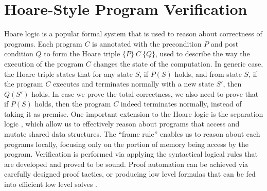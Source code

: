 \label{chapt:related}

\section{Hoare-Style Program Verification}

Hoare logic \cite{hoare69} is a popular formal system that is used to reason about correctness of programs.
Each program $C$ is annotated with the precondition $P$ and post condition $Q$ to form the Hoare triple $\{P\}~C~\{Q\}$, used to
describe the way the execution of the program $C$ changes the state of the computation.
In generic case, the Hoare triple states that for any state $S$, if $P(S)$ holds, and from state $S$, if the program $C$ executes and terminates normally
with a new state $S'$, then $Q(S')$ holds. In case we prove the total correctness, we also need to prove that if $P(S)$ holds, then
the program $C$ indeed terminates normally, instead of taking it as premise.
One important extension to the Hoare logic is the separation logic \cite{reynolds02}, which allow us to effectively reason about
programs that access and mutate shared data structures. The ``frame rule'' enables us to reason about each programs locally,
focusing only on the portion of memory being access by the program.
Verification is performed via applying the syntactical logical rules that are developed and proved to be sound.
Proof automation can be achieved via carefully designed proof tactics, or producing low level formulas that can be fed into
efficient low level solves  \cite{boogie05,dafny10}.

